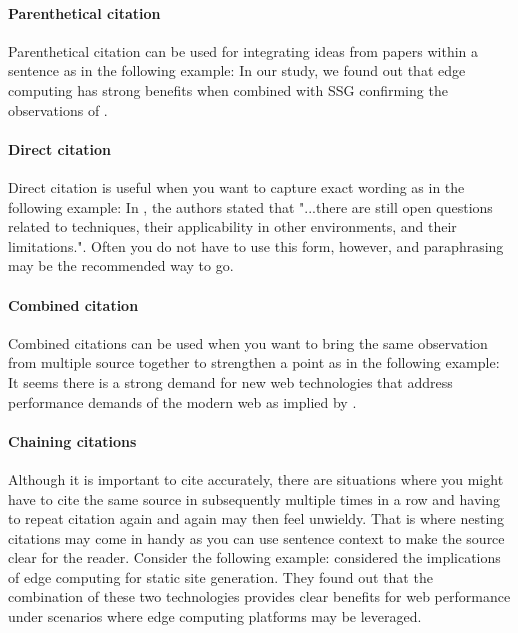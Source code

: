 \paragraph{Parenthetical citation}

Parenthetical citation can be used for integrating ideas from papers within a sentence as in the following example: In our study, we found out that edge computing has strong benefits when combined with SSG confirming the observations of \citep{vepsalainen2023implications}.

\paragraph{Direct citation}

Direct citation is useful when you want to capture exact wording as in the following example: In \citet{vepsalainen2023implications}, the authors stated that "...there are still open questions related to techniques, their applicability in other environments, and their limitations.".
Often you do not have to use this form, however, and paraphrasing may be the recommended way to go.

\paragraph{Combined citation}

Combined citations can be used when you want to bring the same observation from multiple source together to strengthen a point as in the following example: It seems there is a strong demand for new web technologies that address performance demands of the modern web as implied by \citep{vepsalainen2023implications, vepsalainen2023rise}.

\paragraph{Chaining citations}

Although it is important to cite accurately, there are situations where you might have to cite the same source in subsequently multiple times in a row and having to repeat citation again and again may then feel unwieldy.
That is where nesting citations may come in handy as you can use sentence context to make the source clear for the reader.
Consider the following example: \citep{vepsalainen2023implications} considered the implications of edge computing for static site generation. They found out that the combination of these two technologies provides clear benefits for web performance under scenarios where edge computing platforms may be leveraged.

